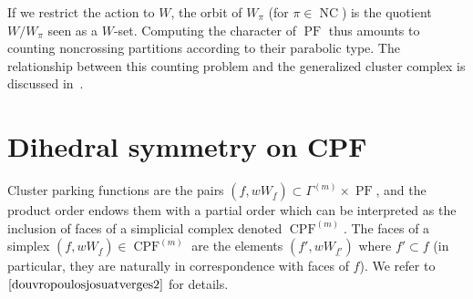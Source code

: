 \documentclass[11pt]{article}
\theoremstyle{definition}
\DeclareMathOperator{\CPF}{CPF}
\DeclareMathOperator{\PF}{PF}
\DeclareMathOperator{\NC}{NC}
\begin{document}
 



If we restrict the action to $W$, the orbit of $W_\pi$ (for $\pi\in\NC$) is the quotient $W/W_\pi$ seen as a $W$-set.  Computing the character of $\PF$ thus amounts to counting noncrossing partitions according to their parabolic type.  The relationship between this counting problem and the generalized cluster complex is discussed in~\cite{douvropoulosjosuatverges1}.


\section{Dihedral symmetry on CPF}
\label{sec:symCPF}

Cluster parking functions are the pairs $(f,wW_{\underline{f}}) \subset \Gamma^{(m)} \times \PF$, and the product order endows them with a partial order which can be interpreted as the inclusion of faces of a simplicial complex denoted $\CPF^{(m)}$.  The faces of a simplex $(f,wW_{\underline{f}}) \in \CPF^{(m)}$ are the elements $(f',wW_{\underline{f'}})$ where $f' \subset f$ (in particular, they are naturally in correspondence with faces of $f$).  We refer to $\cite{douvropoulosjosuatverges2}$ for details.  
\end{document}
